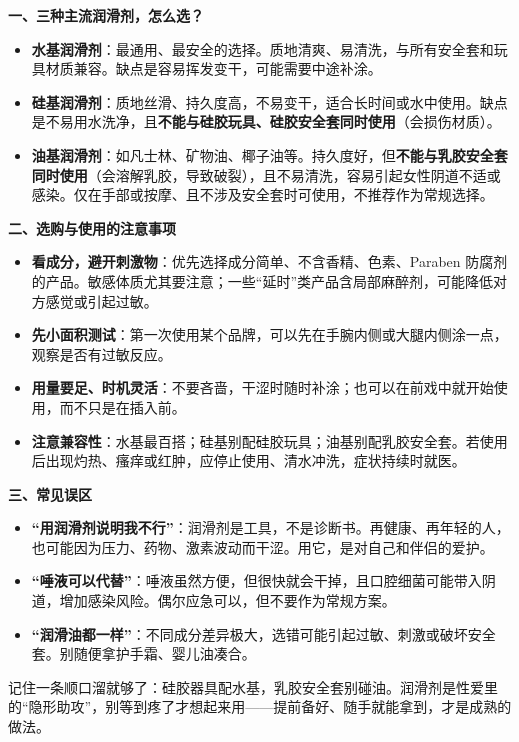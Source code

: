 \documentclass[12pt,UTF8]{ctexbook}
\begin{document}
\textbf{一、三种主流润滑剂，怎么选？}

\begin{itemize}
\item \textbf{水基润滑剂}：最通用、最安全的选择。质地清爽、易清洗，与所有安全套和玩具材质兼容。缺点是容易挥发变干，可能需要中途补涂。
\item \textbf{硅基润滑剂}：质地丝滑、持久度高，不易变干，适合长时间或水中使用。缺点是不易用水洗净，且\textbf{不能与硅胶玩具、硅胶安全套同时使用}（会损伤材质）。
\item \textbf{油基润滑剂}：如凡士林、矿物油、椰子油等。持久度好，但\textbf{不能与乳胶安全套同时使用}（会溶解乳胶，导致破裂），且不易清洗，容易引起女性阴道不适或感染。仅在手部或按摩、且不涉及安全套时可使用，不推荐作为常规选择。
\end{itemize}

\textbf{二、选购与使用的注意事项}

\begin{itemize}
\item \textbf{看成分，避开刺激物}：优先选择成分简单、不含香精、色素、Paraben 防腐剂的产品。敏感体质尤其要注意；一些“延时”类产品含局部麻醉剂，可能降低对方感觉或引起过敏。
\item \textbf{先小面积测试}：第一次使用某个品牌，可以先在手腕内侧或大腿内侧涂一点，观察是否有过敏反应。
\item \textbf{用量要足、时机灵活}：不要吝啬，干涩时随时补涂；也可以在前戏中就开始使用，而不只是在插入前。
\item \textbf{注意兼容性}：水基最百搭；硅基别配硅胶玩具；油基别配乳胶安全套。若使用后出现灼热、瘙痒或红肿，应停止使用、清水冲洗，症状持续时就医。
\end{itemize}

\textbf{三、常见误区}

\begin{itemize}
\item \textbf{“用润滑剂说明我不行”}：润滑剂是工具，不是诊断书。再健康、再年轻的人，也可能因为压力、药物、激素波动而干涩。用它，是对自己和伴侣的爱护。
\item \textbf{“唾液可以代替”}：唾液虽然方便，但很快就会干掉，且口腔细菌可能带入阴道，增加感染风险。偶尔应急可以，但不要作为常规方案。
\item \textbf{“润滑油都一样”}：不同成分差异极大，选错可能引起过敏、刺激或破坏安全套。别随便拿护手霜、婴儿油凑合。
\end{itemize}

\begin{tcolorbox}[colback=pink!5!white,colframe=red!50!black,title=贴心小叮咛]
记住一条顺口溜就够了：硅胶器具配水基，乳胶安全套别碰油。润滑剂是性爱里的“隐形助攻”，别等到疼了才想起来用——提前备好、随手就能拿到，才是成熟的做法。
\end{tcolorbox}
\end{document}
